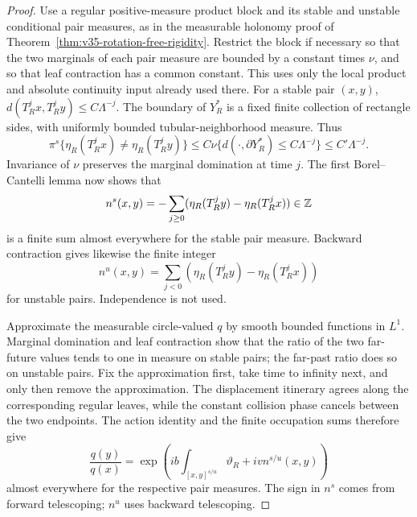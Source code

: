\begin{proof}
Use a regular positive-measure product block and its stable and
unstable conditional pair measures, as in the measurable holonomy
proof of Theorem~\ref{thm:v35-rotation-free-rigidity}. Restrict the
block if necessary so that the two marginals of each pair measure
are bounded by a constant times $\nu$, and so that leaf contraction
has a common constant. This uses only the local product and absolute
continuity input already used there. For a stable pair $(x,y)$,
$d(T_R^j x,T_R^j y)\le C\Lambda^{-j}$.
The boundary of $Y_R^*$ is a fixed finite collection of rectangle
sides, with uniformly bounded tubular-neighborhood measure. Thus
\[
 \pi^s\{\eta_R(T_R^j x)\ne\eta_R(T_R^j y)\}
       \le C\nu\{d(\cdot,\partial Y_R^*)\le C\Lambda^{-j}\}
       \le C'\Lambda^{-j}.
\]
Invariance of $\nu$ preserves the marginal domination at time $j$.
The first Borel--Cantelli lemma now shows that
\[
 n^s(x,y)=-\sum_{j\ge0}
       (\eta_R(T_R^j y)-\eta_R(T_R^j x))\in\mathbb Z
\]
is a finite sum almost everywhere for the stable pair measure.
Backward contraction gives likewise the finite integer
\[
 n^u(x,y)=\sum_{j<0}
       (\eta_R(T_R^j y)-\eta_R(T_R^j x))
\]
for unstable pairs. Independence is not used.

Approximate the measurable circle-valued $q$ by smooth bounded
functions in $L^1$. Marginal domination and leaf contraction show
that the ratio of the two far-future values tends to one in measure
on stable pairs; the far-past ratio does so on unstable pairs.
Fix the approximation first, take time to infinity next, and only
then remove the approximation. The displacement itinerary agrees
along the corresponding regular leaves, while the constant collision
phase cancels between the two endpoints. The action identity and
the finite occupation sums therefore give
\begin{equation}\label{eq:v40-integer-leaf-holonomy}
 \frac{q(y)}{q(x)}
   =\exp\left(ib\int_{[x,y]^{s/u}}\vartheta_R
                     +iv n^{s/u}(x,y)\right)
\end{equation}
almost everywhere for the respective pair measures. The sign in
$n^s$ comes from forward telescoping; $n^u$ uses backward telescoping.


\end{proof}
